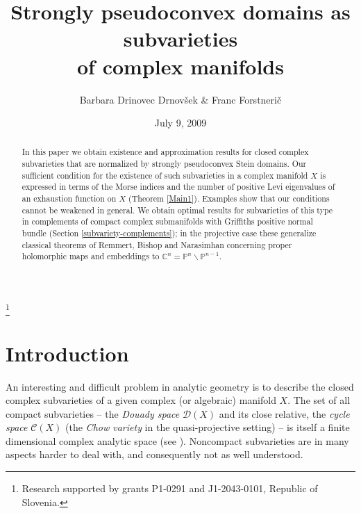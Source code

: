 \documentclass[11pt]{amsart}
\numberwithin{equation}{section}
\theoremstyle{definition}
\begin{document}
\title[Strongly pseudoconvex domains as subvarieties]
{Strongly pseudoconvex domains as subvarieties \\ of complex manifolds}
\author{Barbara Drinovec Drnov\v sek \& Franc Forstneri\v c}
\address{Faculty of Mathematics and Physics, University of Ljubljana, 
and Institute of Mathematics, Physics and Mechanics, Jadranska 19, 
1000 Ljubljana, Slovenia}
\thanks{Research supported by grants P1-0291 and J1-2043-0101, Republic of Slovenia.}

\date{July 9, 2009} 

\begin{abstract}
In this paper we obtain existence and approximation results 
for closed complex subvarieties that are normalized by strongly 
pseudoconvex Stein domains.  Our sufficient condition for 
the existence of such subvarieties 
in a complex manifold $X$ is expressed in terms of 
the Morse indices and the number of positive Levi eigenvalues 
of an exhaustion function on $X$ (Theorem \ref{Main1}). 
Examples show that our conditions cannot be weakened in general. 
We obtain optimal results for subvarieties of this type 
in complements of compact complex submanifolds with 
Griffiths positive normal bundle (Section \ref{subvariety-complements}); 
in the projective case these generalize classical theorems of 
Remmert, Bishop and Narasimhan concerning proper holomorphic maps 
and embeddings to ${\mathbb{C}}^n ={\mathbb{P}}^n{\backslash} {\mathbb{P}}^{n-1}$.
\end{abstract}
\maketitle

{\small {}}

\section{Introduction}
An interesting and difficult problem in analytic geometry is to describe
the closed complex subvarieties of a given complex 
(or algebraic) manifold $X$. The set of all compact subvarieties  
-- the {\em Douady space} ${\mathcal{D}}(X)$ and its close relative, the
{\em cycle space} ${\mathcal{C}}(X)$ (the {\em Chow variety} in the 
quasi-projective setting) -- is itself a finite dimensional 
complex analytic space (see \cite{Barlet,Campana,Douady}).
Noncompact subvarieties are in many aspects harder to deal with,
and consequently not as well understood. 
\end{document}

